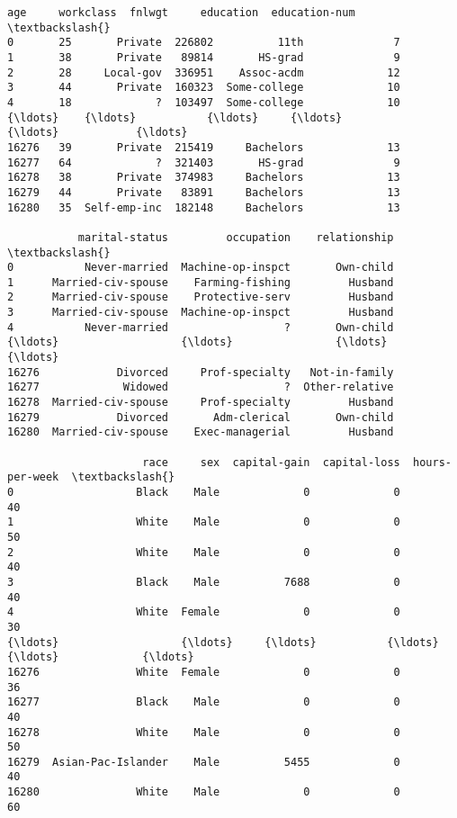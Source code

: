 \documentclass[11pt]{article}
\newcommand{\prompt}[4]{
        \llap{{\color{#2}[#3]: #4}}\vspace{-1.25em}
    }
\begin{document}
            \begin{tcolorbox}[breakable, boxrule=.5pt, size=fbox, pad at break*=1mm, opacityfill=0]
\prompt{Out}{outcolor}{3}{\hspace{3.5pt}}
\begin{Verbatim}[commandchars=\\\{\}]
       age     workclass  fnlwgt     education  education-num  \textbackslash{}
0       25       Private  226802          11th              7
1       38       Private   89814       HS-grad              9
2       28     Local-gov  336951    Assoc-acdm             12
3       44       Private  160323  Some-college             10
4       18             ?  103497  Some-college             10
{\ldots}    {\ldots}           {\ldots}     {\ldots}           {\ldots}            {\ldots}
16276   39       Private  215419     Bachelors             13
16277   64             ?  321403       HS-grad              9
16278   38       Private  374983     Bachelors             13
16279   44       Private   83891     Bachelors             13
16280   35  Self-emp-inc  182148     Bachelors             13

           marital-status         occupation    relationship  \textbackslash{}
0           Never-married  Machine-op-inspct       Own-child
1      Married-civ-spouse    Farming-fishing         Husband
2      Married-civ-spouse    Protective-serv         Husband
3      Married-civ-spouse  Machine-op-inspct         Husband
4           Never-married                  ?       Own-child
{\ldots}                   {\ldots}                {\ldots}             {\ldots}
16276            Divorced     Prof-specialty   Not-in-family
16277             Widowed                  ?  Other-relative
16278  Married-civ-spouse     Prof-specialty         Husband
16279            Divorced       Adm-clerical       Own-child
16280  Married-civ-spouse    Exec-managerial         Husband

                     race     sex  capital-gain  capital-loss  hours-per-week  \textbackslash{}
0                   Black    Male             0             0              40
1                   White    Male             0             0              50
2                   White    Male             0             0              40
3                   Black    Male          7688             0              40
4                   White  Female             0             0              30
{\ldots}                   {\ldots}     {\ldots}           {\ldots}           {\ldots}             {\ldots}
16276               White  Female             0             0              36
16277               Black    Male             0             0              40
16278               White    Male             0             0              50
16279  Asian-Pac-Islander    Male          5455             0              40
16280               White    Male             0             0              60


\end{Verbatim}
\end{tcolorbox}
\end{document}
